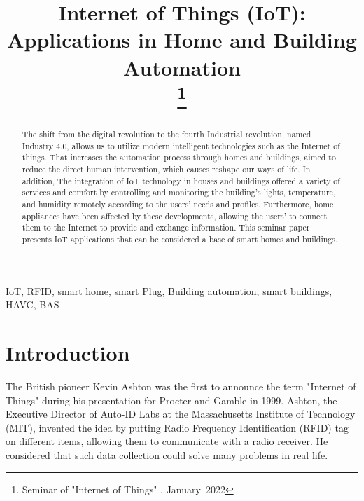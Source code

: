 \documentclass[conference]{IEEEtran}
\begin{document}
\title{Internet of Things (IoT): Applications in  Home and Building Automation 
	\\

\thanks{Seminar of  "Internet of  Things" , January~2022}
}

\author{

}

\maketitle

\begin{abstract}
	
The shift from the digital revolution to the fourth Industrial revolution, named Industry 4.0, allows us to utilize modern intelligent technologies such as the Internet of things. That increases the automation process through homes and buildings, aimed to reduce the direct human intervention, which causes reshape our ways of life. In addition, The integration of  IoT technology in houses and buildings offered a variety of services and comfort by controlling and monitoring the building's lights, temperature, and humidity remotely according to the users' needs and profiles. Furthermore, home appliances have been affected by these developments, allowing the users' to connect them to the Internet to provide and exchange information. This seminar paper presents IoT applications that can be considered a base of smart homes and buildings. 


\end{abstract}

\begin{IEEEkeywords}

IoT, RFID, smart home, smart Plug, Building automation, smart buildings, HAVC, BAS 
\end{IEEEkeywords}

\section{Introduction}


The British pioneer Kevin Ashton was the first to announce the term "Internet of Things" during his presentation for Procter and Gamble in 1999. Ashton, the Executive Director of Auto-ID Labs at the Massachusetts Institute of Technology (MIT), invented the idea by putting Radio Frequency Identification (RFID) tag on different items, allowing them to communicate with a radio receiver. He considered that such data collection could solve many problems in real life. 
\end{document}
